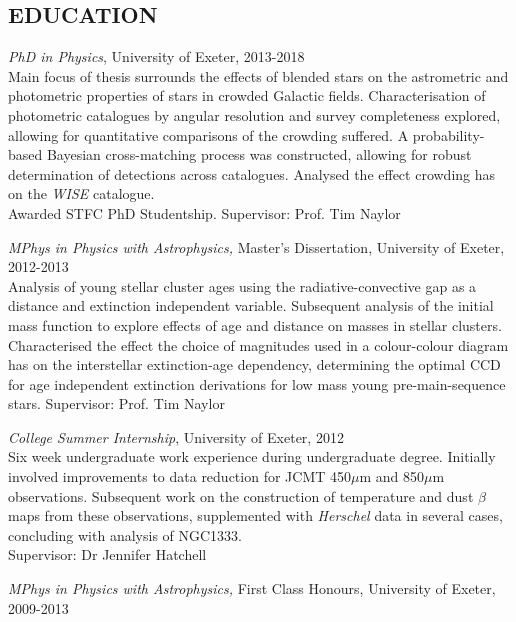 \documentclass[letter, margin, 10pt]{res} %
\begin{document}
\begin{resume}
\section{EDUCATION}

{\sl PhD in Physics}, University of Exeter, 2013-2018\\
Main focus of thesis surrounds the effects of blended stars on the astrometric and photometric properties of stars in crowded Galactic fields. Characterisation of photometric catalogues by angular resolution and survey completeness explored, allowing for quantitative comparisons of the crowding suffered. A probability-based Bayesian cross-matching process was constructed, allowing for robust determination of detections across catalogues. Analysed the effect crowding has on the \textit{WISE} catalogue. \\Awarded STFC PhD Studentship. Supervisor: Prof. Tim Naylor

{\sl MPhys in Physics with Astrophysics,} Master's Dissertation, University of Exeter, 2012-2013 \\
Analysis of young stellar cluster ages using the radiative-convective gap as a distance and extinction independent variable. Subsequent analysis of the initial mass function to explore effects of age and distance on masses in stellar clusters. Characterised the effect the choice of magnitudes used in a colour-colour diagram has on the interstellar extinction-age dependency, determining the optimal CCD for age independent extinction derivations for low mass young pre-main-sequence stars. Supervisor: Prof. Tim Naylor

{\sl College Summer Internship}, University of Exeter, 2012\\
Six week undergraduate work experience during undergraduate degree. Initially involved improvements to data reduction for JCMT 450$\mu$m and 850$\mu$m observations. Subsequent work on the construction of temperature and dust $\beta$ maps from these observations, supplemented with \textit{Herschel} data in several cases, concluding with analysis of NGC1333.\\Supervisor: Dr Jennifer Hatchell

{\sl MPhys in Physics with Astrophysics,} First Class Honours, University of Exeter, 2009-2013
\parskip 5pt
\vspace{-5pt}

\end{resume}
\end{document}
